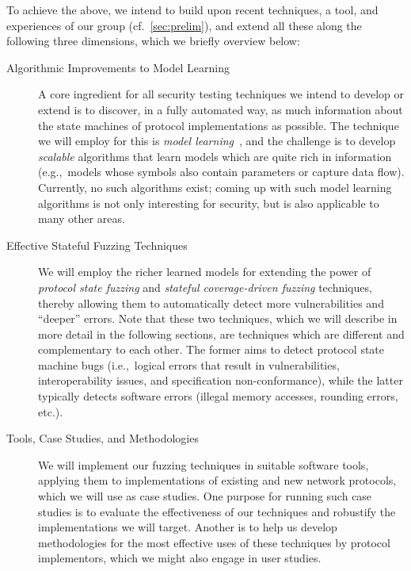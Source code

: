 \documentclass[11pt]{article}
\newcommand{\eg}{e.\/g.,\ }
\newcommand{\ie}{i.\/e.,\ }
\begin{document}
To achieve the above, we intend to build upon recent techniques, a tool, and
experiences of our group (cf.\ \cref{sec:prelim}), and extend all these along
the following three dimensions, which we briefly overview below:
\begin{description}
\item[Algorithmic Improvements to Model Learning] A core ingredient for all
  security testing techniques we intend to develop or extend is to discover,
  in a fully automated way, as much information about the state machines of
  protocol implementations as possible. The technique we will employ for this
  is \emph{model learning}~\cite{Angluin1987,Vaandrager@CACM-17}, and the
  challenge is to develop \emph{scalable} algorithms that learn models which
  are quite rich in information (\eg models whose symbols also contain
  parameters or capture data flow). Currently, no such algorithms exist;
  coming up with such model learning algorithms is not only interesting for
  security, but is also applicable to many other areas.
\item[Effective Stateful Fuzzing Techniques] We will employ the richer
  learned models for extending the power of \emph{protocol state fuzzing} and
  \emph{stateful coverage-driven fuzzing} techniques, thereby allowing them to
  automatically detect more vulnerabilities and ``deeper'' errors. Note that
  these two techniques, which we will describe in more detail in the following
  sections, are techniques which are different and complementary to each
  other. The former aims to detect protocol state machine bugs (\ie logical
  errors that result in vulnerabilities, interoperability issues, and
  specification non-conformance), while the latter typically detects software
  errors (illegal memory accesses, rounding errors, etc.).
\item[Tools, Case Studies, and Methodologies] We will implement our fuzzing
  techniques in suitable software tools, applying them to implementations of
  existing and new network protocols, which we will use as case studies. One
  purpose for running such case studies is to evaluate the effectiveness of
  our techniques and robustify the implementations we will target. Another is
  to help us develop methodologies for the most effective uses of these
  techniques by protocol implementors, which we might also engage in user
  studies.
\end{description}
\end{document}
